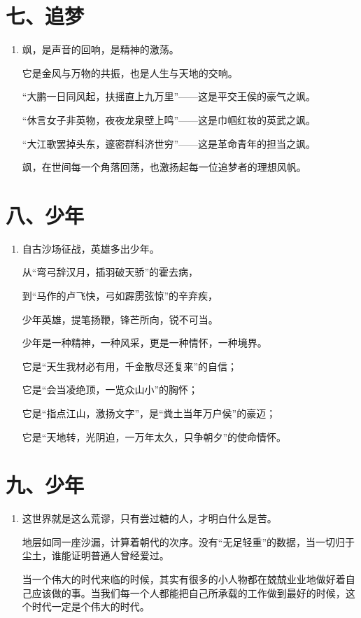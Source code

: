 \newpage

\section*{七、追梦}

\begin{enumerate}[leftmargin=*]
    \item 飒，是声音的回响，是精神的激荡。
    
    它是金风与万物的共振，也是人生与天地的交响。
    
    “大鹏一日同风起，扶摇直上九万里”——这是平交王侯的豪气之飒。
    
    “休言女子非英物，夜夜龙泉壁上鸣”——这是巾帼红妆的英武之飒。
    
    “大江歌罢掉头东，邃密群科济世穷”——这是革命青年的担当之飒。
    
    飒，在世间每一个角落回荡，也激扬起每一位追梦者的理想风帆。
\end{enumerate}

\newpage

\section*{八、少年}

\begin{enumerate}[leftmargin=*]
    \item 自古沙场征战，英雄多出少年。
    
    从“弯弓辞汉月，插羽破天骄”的霍去病，
    
    到“马作的卢飞快，弓如霹雳弦惊”的辛弃疾，
    
    少年英雄，提笔扬鞭，锋芒所向，锐不可当。
    
    少年是一种精神，一种风采，更是一种情怀，一种境界。
    
    它是“天生我材必有用，千金散尽还复来”的自信；
    
    它是“会当凌绝顶，一览众山小”的胸怀；
    
    它是“指点江山，激扬文字”，是“粪土当年万户侯”的豪迈；
    
    它是“天地转，光阴迫，一万年太久，只争朝夕”的使命情怀。
\end{enumerate}



\section*{九、少年}

\begin{enumerate}[leftmargin=*]
    \item 这世界就是这么荒谬，只有尝过糖的人，才明白什么是苦。
    
    地层如同一座沙漏，计算着朝代的次序。没有“无足轻重”的数据，当一切归于尘土，谁能证明普通人曾经爱过。
    
    当一个伟大的时代来临的时候，其实有很多的小人物都在兢兢业业地做好着自己应该做的事。当我们每一个人都能把自己所承载的工作做到最好的时候，这个时代一定是个伟大的时代。
\end{enumerate}